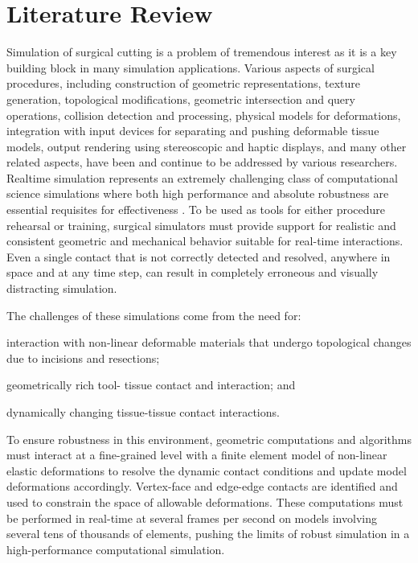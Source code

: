 
\chapter{Literature Review}
\label{chp:literature}

Simulation of surgical cutting is a problem of tremendous interest as it is a key building block in many simulation applications. Various aspects of surgical procedures, including construction of geometric representations, texture generation, topological modifications, geometric intersection and query operations, collision detection and processing, physical models for deformations, integration with input devices for separating and pushing deformable tissue models, output rendering using  stereoscopic and haptic displays, and many other related aspects, have been and continue to be addressed by various researchers. Realtime simulation represents an extremely challenging class of computational science simulations where both high performance and absolute robustness are essential requisites for effectiveness \autocite{younes:cbm:2013}. To be used as tools for either procedure rehearsal or training, surgical simulators must provide support for realistic and consistent geometric and mechanical behavior \autocite{farhat:hsmr:2012} suitable for real-time interactions. Even a single contact that is not correctly detected and resolved, anywhere in space and at any time step, can result in completely erroneous and visually distracting simulation.

The challenges of these simulations come from the need for:
\begin{enumerate*}[(1)]
  \item interaction with non-linear deformable materials that undergo topological changes due to incisions and resections;
  \item geometrically rich tool-
tissue contact and interaction; and
  \item dynamically changing tissue-tissue contact interactions.
\end{enumerate*}
To ensure robustness in this environment, geometric computations and algorithms must interact at a fine-grained level with a finite element model of non-linear elastic deformations to resolve the dynamic contact conditions and update model deformations accordingly. Vertex-face and edge-edge contacts are identified and used to constrain the space of allowable deformations. These computations must be performed in real-time at several frames per second on models involving several tens of thousands of elements, pushing the limits of robust simulation in a high-performance computational simulation.

